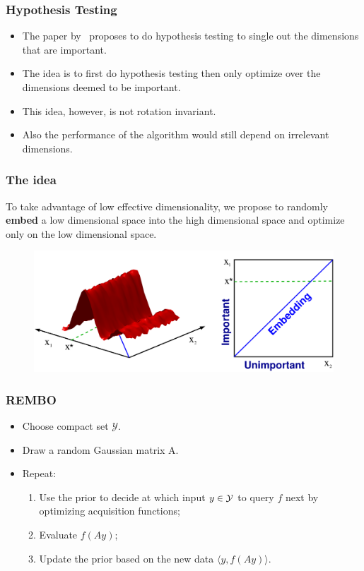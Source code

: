 \documentclass[grey]{beamer}
\begin{document}
  \begin{frame}
  \frametitle{Hypothesis Testing}
  \begin{itemize}
   \item The paper by~\protect\cite{Chen:2012} proposes to do hypothesis testing to 
   single out the dimensions that are important. 
   \item The idea is to first do hypothesis testing then only optimize over the 
   dimensions deemed to be important.
   \item This idea, however, is not rotation invariant.
   \item Also the performance of the algorithm would still 
   depend on irrelevant dimensions.
  \end{itemize}

   
  \end{frame}

  
 \begin{frame}
  \frametitle{The idea}
  To take advantage of low effective dimensionality, we propose to 
  randomly {\bf \textcolor{myColor}{embed}} 
  a low dimensional space into the high dimensional space and optimize
  only on the low dimensional space.
  \begin{figure}[t]
   \includegraphics[width = 0.9\columnwidth]
   {../paper/figures/2to1embedding}
   \label{fig:ESSL_BLR}
  \end{figure}
 \end{frame}
 
 \begin{frame}
  \frametitle{REMBO}
  \begin{itemize}
   \item Choose compact set {\bf \textcolor{myColor}{$\mathcal{Y}$}}.
   \item Draw a random Gaussian matrix A.
   \item Repeat:
   \begin{enumerate}
    \item Use the prior to decide at which input $y \in \cal Y$ to query $f$ next
    by optimizing acquisition functions;
    \item Evaluate {\bf \textcolor{myColor}{$f(Ay)$}};
    \item Update the prior based on the new data 
    {\bf \textcolor{myColor}{$\langle{}y, f(Ay)\rangle$}}.
   \end{enumerate}
  \end{itemize}
 \end{frame}
\end{document}
